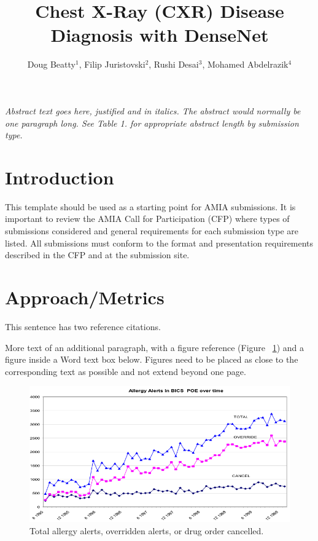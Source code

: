 \documentclass{amia}
\begin{document}
\title{Chest X-Ray (CXR) Disease Diagnosis with DenseNet}

\author{Doug Beatty$^{1}$, Filip Juristovski$^{2}$, Rushi Desai$^{3}$, Mohamed Abdelrazik$^{4}$}


\maketitle


\textit{Abstract text goes here, justified and in italics.  The abstract would normally be one paragraph long.  See Table 1. for appropriate abstract length by submission type.}

\section*{Introduction}
This template should be used as a starting point for AMIA submissions.
It is important to review the AMIA Call for Participation (CFP) where types of submissions considered and general requirements for each submission type are listed. All submissions must conform to the format and presentation requirements described in the CFP and at the submission site.


\section*{Approach/Metrics}
This sentence has two reference citations\cite{ref1,ref2}.

More text of an additional paragraph, with a figure reference (Figure ~\ref{fig1}) and a figure inside a Word text box below.  Figures need to be placed as close to the corresponding text as possible and not extend beyond one page.\\
\begin{figure}[h!]
\centering
\includegraphics[scale=1]{pics/figure1.png}
\caption{Total allergy alerts, overridden alerts, or drug order cancelled.}
\label{fig1}
\end{figure}
\end{document}
